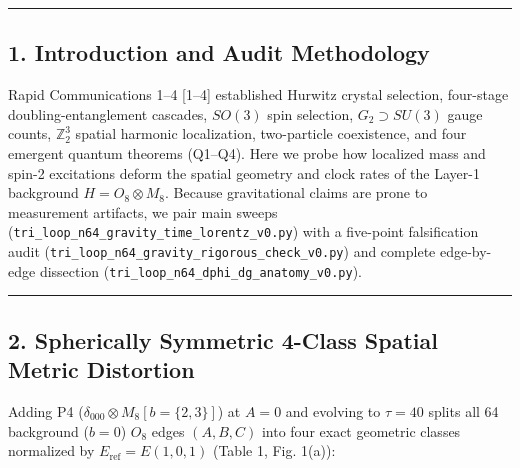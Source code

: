\documentclass[
  a4paper,
]{article}
\begin{document}
\begin{center}\rule{0.5\linewidth}{0.5pt}\end{center}

\subsection{1. Introduction and Audit
Methodology}\label{introduction-and-audit-methodology}

Rapid Communications 1--4 {[}1--4{]} established Hurwitz crystal
selection, four-stage doubling-entanglement cascades, \(SO(3)\) spin
selection, \(G_2 \supset SU(3)\) gauge counts, \(\mathbb{Z}_2^3\)
spatial harmonic localization, two-particle coexistence, and four
emergent quantum theorems (Q1--Q4). Here we probe how localized mass and
spin-2 excitations deform the spatial geometry and clock rates of the
Layer-1 background \(H = O_8 \otimes M_8\). Because gravitational claims
are prone to measurement artifacts, we pair main sweeps
(\texttt{tri\_loop\_n64\_gravity\_time\_lorentz\_v0.py}) with a
five-point falsification audit
(\texttt{tri\_loop\_n64\_gravity\_rigorous\_check\_v0.py}) and complete
edge-by-edge dissection
(\texttt{tri\_loop\_n64\_dphi\_dg\_anatomy\_v0.py}).

\begin{center}\rule{0.5\linewidth}{0.5pt}\end{center}

\subsection{2. Spherically Symmetric 4-Class Spatial Metric
Distortion}\label{spherically-symmetric-4-class-spatial-metric-distortion}

Adding P4 (\(\delta_{000} \otimes M_8[b=\{2,3\}]\)) at \(A = 0\) and
evolving to \(\tau = 40\) splits all 64 background (\(b = 0\)) \(O_8\)
edges \((A, B, C)\) into four exact geometric classes normalized by
\(E_{\mathrm{ref}} = E(1, 0, 1)\) (Table 1, Fig. 1(a)):
\end{document}
